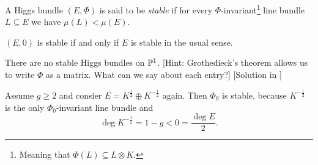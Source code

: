 \documentclass[A4paper, 12pt, british, reqno]{amsart}
\newcommand{\ot}{\otimes}
\newcommand{\op}{\oplus}
\begin{document}
\begin{defn}[Stability]
A Higgs bundle $(E,\Phi)$ is said to be \textit{stable} if for every $\Phi$-invariant\footnote{Meaning that $\Phi(L)\subseteq L\ot K$.} line bundle $L\subseteq E$ we have $\mu(L)<\mu(E)$.
\end{defn}

\begin{rem}
    $(E,0)$ is stable if and only if $E$ is stable in the usual sense.
\end{rem}

\begin{exe}
    There are no stable Higgs bundles on $\P^{1}$.
    [Hint: Grothedieck's theorem allows us to write $\Phi$ as a matrix. What can we say about each entry?]
    [Solution in \cite{hit87a}]
\end{exe}

\begin{exa}
    Assume $g\geqslant 2$ and consier $E=K^{\frac{1}{2}}\op K^{-\frac{1}{2}}$ again.
    Then $\Phi_{0}$ is stable, because $K^{-\frac{1}{2}}$ is the only $\Phi_{0}$-invariant line bundle and
    \[ \deg{K^{-\frac{1}{2}}}=1-g<0=\frac{\deg{E}}{2}. \]
\end{exa}
\end{document}
